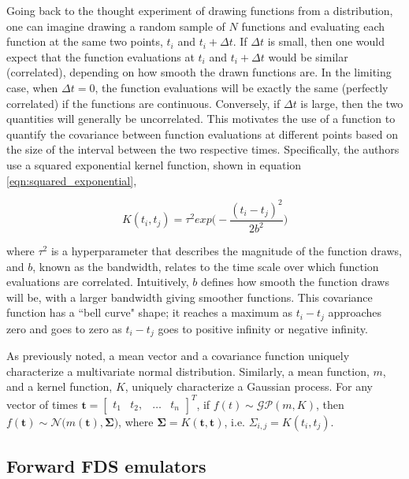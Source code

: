 \documentclass{article}
\begin{document}
Going back to the thought experiment of drawing functions from a distribution, one can imagine drawing a random sample of $N$ functions and evaluating each function at the same two points, $t_i$ and $t_i + \Delta t$. If $\Delta t$ is small, then one would expect that the function evaluations at $t_i$ and $t_i + \Delta t$ would be similar (correlated), depending on how smooth the drawn functions are. In the limiting case, when $\Delta t = 0$, the function evaluations will be exactly the same (perfectly correlated) if the functions are continuous. Conversely, if $\Delta t$ is large, then the two quantities will generally be uncorrelated. This motivates the use of a function to quantify the covariance between function evaluations at different points based on the size of the interval between the two respective times. Specifically, the authors use a squared exponential kernel function, shown in equation \ref{eqn:squared_exponential}, 


 \begin{equation}
  \label{eqn:squared_exponential}
    K(t_i, t_j) = \tau^2exp\bigg(-\frac{(t_i-t_j)^2}{2b^2}\bigg)
\end{equation}

\noindent where $\tau^2$ is a hyperparameter that describes the magnitude of the function draws, and $b$, known as the bandwidth, relates to the time scale over which function evaluations are correlated. Intuitively, $b$ defines how smooth the function draws will be, with a larger bandwidth giving smoother functions. This covariance function has a ``bell curve" shape; it reaches a maximum as $t_i - t_j$ approaches zero and goes to zero as $t_i - t_j$ goes to positive infinity or negative infinity. 


As previously noted, a mean vector and a covariance function uniquely characterize a multivariate normal distribution. Similarly, a mean function, $m$, and a kernel function, $K$, uniquely characterize a Gaussian process. For any vector of times $\boldsymbol{t} = \begin{bmatrix}  t_1 & t_2, & \ldots & t_n \end{bmatrix}^T$, if $f(t) \sim \mathcal{GP}(m,K)$, then $f(\boldsymbol{t}) \sim \mathcal{N}\Big(m(\boldsymbol{t}), \boldsymbol{\Sigma}\Big)$, where $\boldsymbol{\Sigma} =  K(\boldsymbol{t},\boldsymbol{t})$, i.e. $\Sigma_{i,j} = K(t_i, t_j)$. 





\subsection{Forward FDS emulators}
\end{document}
